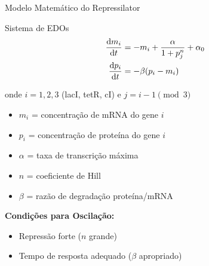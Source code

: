 \begin{frame}{Modelo Matemático do Repressilator}
\begin{block}{Sistema de EDOs}
\begin{align*}
\frac{\mathrm{d} m_i}{\mathrm{d} t} &= -m_i + \frac{\alpha}{1 + p_j^n} + \alpha_0\\
\frac{\mathrm{d} p_i}{\mathrm{d} t} &= -\beta(p_i - m_i)
\end{align*}

onde $i = 1, 2, 3$ (lacI, tetR, cI) e $j = i-1 \pmod{3}$

\begin{itemize}
    \item $m_i$ = concentração de mRNA do gene $i$
    \item $p_i$ = concentração de proteína do gene $i$
    \item $\alpha$ = taxa de transcrição máxima
    \item $n$ = coeficiente de Hill
    \item $\beta$ = razão de degradação proteína/mRNA
\end{itemize}
\end{block}

\textbf{Condições para Oscilação:}
\begin{itemize}
    \item Repressão forte ($n$ grande)
    \item Tempo de resposta adequado ($\beta$ apropriado)
\end{itemize}
\end{frame}

